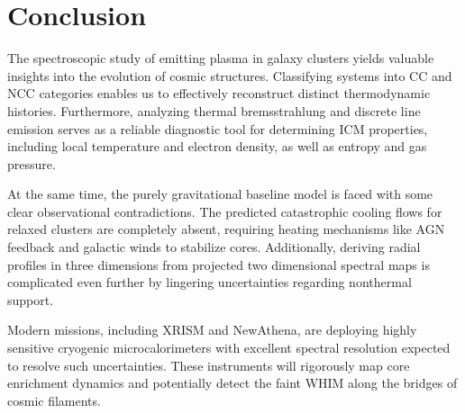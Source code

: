 \section{Conclusion}
\label{sec:conclusion}

The spectroscopic study of \xray emitting plasma in galaxy clusters yields valuable insights into the evolution of cosmic structures.
Classifying systems into CC and NCC categories enables us to effectively reconstruct distinct thermodynamic histories. Furthermore,
analyzing thermal bremsstrahlung and discrete line emission serves as a reliable diagnostic tool for determining ICM properties,
including local temperature and electron density, as well as entropy and gas pressure. 

At the same time, the purely gravitational baseline model is faced with some clear observational contradictions. The predicted catastrophic
cooling flows for relaxed clusters are completely absent, requiring heating mechanisms like AGN feedback and galactic winds to stabilize
cores. Additionally, deriving radial profiles in three dimensions from projected two dimensional spectral maps is complicated even further by
lingering uncertainties regarding nonthermal support. 

Modern \xray missions, including XRISM and NewAthena, are deploying highly sensitive cryogenic microcalorimeters with excellent spectral
resolution expected to resolve such uncertainties. These instruments will rigorously map core enrichment dynamics and potentially detect the faint
WHIM \xrays along the bridges of cosmic filaments.  
